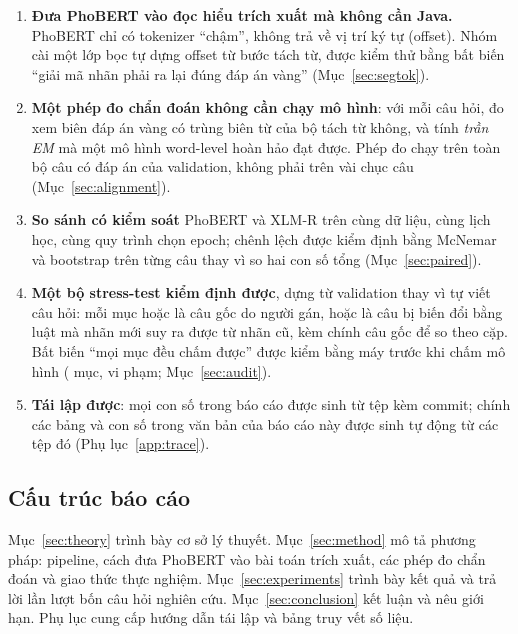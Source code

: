 \begin{enumerate}
  \item \textbf{Đưa PhoBERT vào đọc hiểu trích xuất mà không cần Java.} PhoBERT chỉ có
        tokenizer ``chậm'', không trả về vị trí ký tự (offset). Nhóm cài một lớp bọc tự dựng
        offset từ bước tách từ, được kiểm thử bằng bất biến ``giải mã nhãn phải ra lại đúng
        đáp án vàng'' (Mục~\ref{sec:segtok}).
  \item \textbf{Một phép đo chẩn đoán không cần chạy mô hình}: với mỗi câu hỏi, đo xem biên
        đáp án vàng có trùng biên từ của bộ tách từ không, và tính \emph{trần EM} mà một mô
        hình word-level hoàn hảo đạt được. Phép đo chạy trên toàn bộ \NValAns{} câu có đáp án
        của validation, không phải trên vài chục câu (Mục~\ref{sec:alignment}).
  \item \textbf{So sánh có kiểm soát} PhoBERT và XLM-R trên cùng dữ liệu, cùng lịch học, cùng
        quy trình chọn epoch; chênh lệch được kiểm định bằng McNemar và bootstrap trên từng
        câu thay vì so hai con số tổng (Mục~\ref{sec:paired}).
  \item \textbf{Một bộ stress-test kiểm định được}, dựng từ validation thay vì tự viết câu
        hỏi: mỗi mục hoặc là câu gốc do người gán, hoặc là câu bị biến đổi bằng luật mà nhãn
        mới suy ra được từ nhãn cũ, kèm chính câu gốc để so theo cặp. Bất biến ``mọi mục đều
        chấm được'' được kiểm bằng máy trước khi chấm mô hình (\StressN{} mục, \StressViol{}
        vi phạm; Mục~\ref{sec:audit}).
  \item \textbf{Tái lập được}: mọi con số trong báo cáo được sinh từ tệp
         kèm commit; chính các bảng và con số trong văn bản của báo cáo
        này được sinh tự động từ các tệp đó (Phụ lục~\ref{app:trace}).
\end{enumerate}

\subsection{Cấu trúc báo cáo}

Mục~\ref{sec:theory} trình bày cơ sở lý thuyết. Mục~\ref{sec:method} mô tả phương pháp:
pipeline, cách đưa PhoBERT vào bài toán trích xuất, các phép đo chẩn đoán và giao thức thực
nghiệm. Mục~\ref{sec:experiments} trình bày kết quả và trả lời lần lượt bốn câu hỏi nghiên
cứu. Mục~\ref{sec:conclusion} kết luận và nêu giới hạn. Phụ lục cung cấp hướng dẫn tái lập
và bảng truy vết số liệu.
